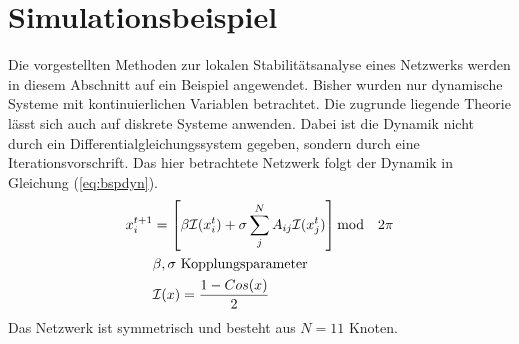 \section{Simulationsbeispiel}
Die vorgestellten Methoden zur lokalen Stabilitätsanalyse eines Netzwerks werden in diesem Abschnitt auf ein Beispiel angewendet. Bisher wurden nur dynamische Systeme mit kontinuierlichen Variablen betrachtet. Die zugrunde liegende Theorie lässt sich auch auf diskrete Systeme anwenden. Dabei ist die Dynamik nicht durch ein Differentialgleichungssystem gegeben, sondern durch eine Iterationsvorschrift. Das hier betrachtete Netzwerk \cite{pecora2014} folgt der Dynamik in Gleichung (\ref{eq:bspdyn}).
\begin{align}
	x_i^{t+1}&=\left[\beta\mathcal{I}(x_i^t)+\sigma \sum_j^N A_{ij}\mathcal{I}(x_j^t)\right] \text{mod}\quad 2\pi
	\\\notag & \beta,\sigma \text{ Kopplungsparameter}
	\\\notag &\mathcal{I}(x)=\frac{1-Cos(x)}{2}
\end{align}\label{eq:bspdyn}
Das Netzwerk ist symmetrisch und besteht aus $N=11$ Knoten.